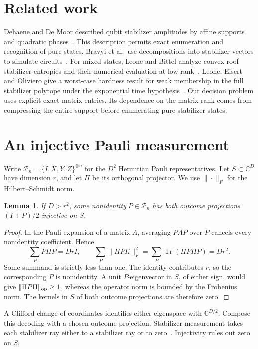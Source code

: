 \documentclass[11pt,letterpaper]{article}
\newtheorem{lemma}[theorem]{Lemma}
\theoremstyle{definition}
\numberwithin{equation}{section}
\DeclareMathOperator{\Tr}{Tr}
\newcommand{\C}{\mathbb C}
\begin{document}
\section{Related work}
Dehaene and De Moor described qubit stabilizer amplitudes by affine supports and quadratic phases~\cite{ddm}. This description permits exact enumeration and recognition of pure states. Bravyi et al.\ use decompositions into stabilizer vectors to simulate circuits~\cite{bravyi}. For mixed states, Leone and Bittel analyze convex-roof stabilizer entropies and their numerical evaluation at low rank~\cite{lb}. Leone, Eisert and Oliviero give a worst-case hardness result for weak membership in the full stabilizer polytope under the exponential time hypothesis~\cite{leo}. Our decision problem uses explicit exact matrix entries. Its dependence on the matrix rank comes from compressing the entire support before enumerating pure stabilizer states.

\section{An injective Pauli measurement}
Write \(\mathcal P_n=\{I,X,Y,Z\}^{\otimes n}\) for the \(D^2\) Hermitian Pauli representatives. Let \(S\subset\C^D\) have dimension \(r\), and let \(\Pi\) be its orthogonal projector. We use \(\|\cdot\|_F\) for the Hilbert--Schmidt norm.
\begin{lemma}\label{lem:average}
If \(D>r^2\), some nonidentity \(P\in\mathcal P_n\) has both outcome projections \((I\pm P)/2\) injective on \(S\).
\end{lemma}
\begin{proof}
In the Pauli expansion of a matrix \(A\), averaging \(PAP\) over \(P\) cancels every nonidentity coefficient. Hence
\[
\sum_{P}P\Pi P=Dr I,\qquad
\sum_{P}\|\Pi P\Pi\|_F^2
 =\sum_{P}\Tr(\Pi P\Pi P)=Dr^2 .
\]
Some summand is strictly less than one. The identity contributes \(r\), so the corresponding \(P\) is nonidentity. A unit \(P\)-eigenvector in \(S\), of either sign, would give \(\|\Pi P\Pi\|_{\rm op}\ge1\), whereas the operator norm is bounded by the Frobenius norm. The kernels in \(S\) of both outcome projections are therefore zero.
\end{proof}
A Clifford change of coordinates identifies either eigenspace with \(\C^{D/2}\). Compose this decoding with a chosen outcome projection. Stabilizer measurement takes each stabilizer ray either to a stabilizer ray or to zero~\cite{ddm,bravyi}. Injectivity rules out zero on \(S\).
\end{document}

